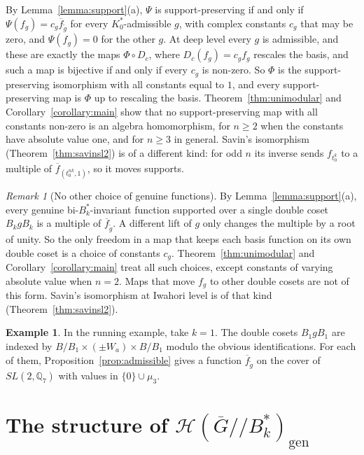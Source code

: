 \documentclass[12pt,letterpaper]{amsart}
\numberwithin{equation}{section}
\theoremstyle{definition}
\newtheorem{example}[theorem]{Example}
\theoremstyle{remark}
\newtheorem{remark}[theorem]{Remark}
\newcommand{\cH}{\mathcal{H}}
\newcommand{\Gbar}{\overline{G}}
\newcommand{\gen}{\mathrm{gen}}
\newcommand{\fbar}{\overline{f}}
\begin{document}
By Lemma~\ref{lemma:support}(a), $\Psi$ is support-preserving if and
only if $\Psi(f_g)=c_g\fbar_{\tilde g}$ for every $K_0^*$-admissible
$g$, with complex constants $c_g$ that may be zero, and $\Psi(f_g)=0$
for the other $g$. At deep level every $g$ is admissible, and these
are exactly the maps $\Phi\circ D_c$, where $D_c(f_g)=c_gf_g$ rescales the basis, and
such a map is bijective if and only if every $c_g$ is non-zero. So
$\Phi$ is the support-preserving isomorphism with all constants equal to
$1$, and every support-preserving map is $\Phi$ up to rescaling the
basis. Theorem~\ref{thm:unimodular} and Corollary~\ref{corollary:main}
show that no support-preserving map with all constants non-zero is an
algebra homomorphism, for $n\geq 2$ when the constants have absolute
value one, and for $n\geq 3$ in general. Savin's isomorphism
(Theorem~\ref{thm:savinsl2}) is of a different kind: for odd $n$ its
inverse sends $f_{t_0^k}$ to a multiple of $\fbar_{(t_0^{nk},1)}$, so
it moves supports.

\begin{remark}[No other choice of genuine functions]
\label{rem:nochoice}
By Lemma~\ref{lemma:support}(a), every genuine bi-$B_k^*$-invariant
function supported over a single double coset $B_kgB_k$ is a multiple
of $\fbar_{\tilde g}$. A different lift of $g$ only changes the multiple
by a root of unity. So the only freedom in a map that keeps each basis
function on its own double coset is a choice of constants $c_g$.
Theorem~\ref{thm:unimodular} and Corollary~\ref{corollary:main} treat
all such choices, except constants of varying absolute value when
$n=2$. Maps that move $f_g$ to other double cosets are not of
this form. Savin's isomorphism at Iwahori level is of that kind
(Theorem~\ref{thm:savinsl2}).
\end{remark}

\begin{example}
In the running example, take $k=1$. The double cosets $B_1gB_1$ are
indexed by $B/B_1\times(\pm W_a)\times B/B_1$ modulo the obvious
identifications. For each of them, Proposition~\ref{prop:admissible}
gives a function $\fbar_{\tilde g}$ on the cover of $SL(2,\mathbb{Q}_7)$
with values in $\{0\}\cup\mu_3$.
\end{example}

\section{The structure of
\texorpdfstring{$\cH(\Gbar/\!/B_k^*)_{\gen}$}{the genuine Hecke algebra}}
\label{section:metaplectic}
\end{document}
